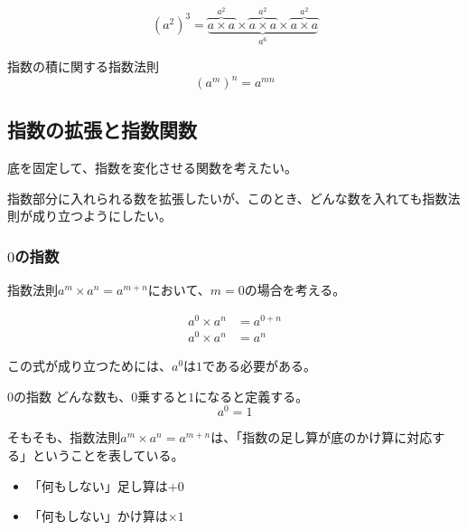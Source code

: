 \documentclass[../math-imaging]{subfiles}
\begin{document}
\begin{equation}
  (a^2)^3 = \underbrace{\overbrace{a\times a}^{a^2} \times \overbrace{a\times a}^{a^2} \times \overbrace{a\times a}^{a^2}}_{a^6}
\end{equation}

\begin{theorem}{指数の積に関する指数法則}
  \LARGE
  \begin{equation}
    (a^m)^n = a^{mn}
  \end{equation}
\end{theorem}

\subsection{指数の拡張と指数関数}

底を固定して、指数を変化させる関数を考えたい。

指数部分に入れられる数を拡張したいが、このとき、どんな数を入れても指数法則が成り立つようにしたい。

\subsubsection{$0$の指数}

指数法則$a^m \times a^n = a^{m+n}$において、$m=0$の場合を考える。

\begin{align}
  a^0 \times a^n & = a^{0+n} \\
  a^0 \times a^n & = a^n
\end{align}

この式が成り立つためには、$a^0$は$1$である必要がある。

\begin{definition}{$0$の指数}
  \newline
  どんな数も、$0$乗すると$1$になると定義する。
  \LARGE
  \begin{equation}
    a^0 = 1
  \end{equation}
\end{definition}

そもそも、指数法則$a^m \times a^n = a^{m+n}$は、「指数の足し算が底のかけ算に対応する」ということを表している。

\begin{itemize}
  \item 「何もしない」足し算は$+ 0$
  \item 「何もしない」かけ算は$\times 1$
\end{itemize}
\end{document}
